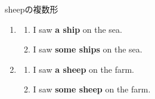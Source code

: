 \documentclass[aspectratio=169, xcolor={dvipsnames,table}]{beamer}
\begin{document}
\begin{frame}[plain]{sheepの複数形}
  \begin{enumerate}
    \item
          \begin{enumerate}
            \item<2-> I saw {\bfseries a ship} on the sea.

            \item<3-> I saw {\bfseries some ships }on the sea.
          \end{enumerate}

    \item
          \begin{enumerate}
            \item<4-> I saw {\bfseries a sheep} on the farm.

            \item<5-> I saw {\bfseries some sheep} on the farm.
          \end{enumerate}

          \vspace{40pt}


  \end{enumerate}
\end{frame}
\end{document}
